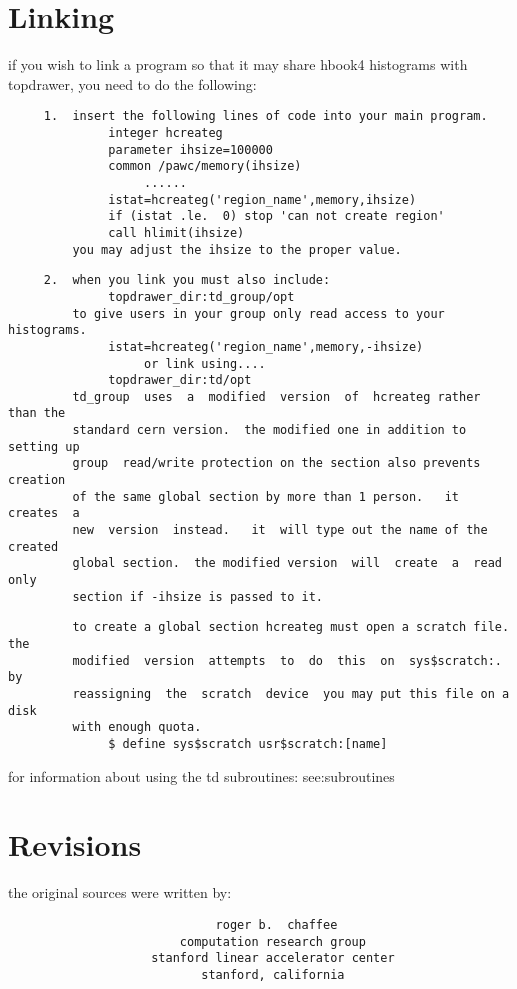 \section{Linking}
if  you  wish to link a program so that it may share hbook4 histograms with
topdrawer, you need to do the following:  

\begin{verbatim}
     1.  insert the following lines of code into your main program.  
              integer hcreateg 
              parameter ihsize=100000 
              common /pawc/memory(ihsize) 
                   ......  
              istat=hcreateg('region_name',memory,ihsize) 
              if (istat .le.  0) stop 'can not create region' 
              call hlimit(ihsize) 
         you may adjust the ihsize to the proper value.  
\end{verbatim}

\begin{verbatim}
     2.  when you link you must also include:  
              topdrawer_dir:td_group/opt 
         to give users in your group only read access to your histograms.  
              istat=hcreateg('region_name',memory,-ihsize) 
                   or link using....  
              topdrawer_dir:td/opt 
         td_group  uses  a  modified  version  of  hcreateg rather than the
         standard cern version.  the modified one in addition to setting up
         group  read/write protection on the section also prevents creation
         of the same global section by more than 1 person.   it  creates  a
         new  version  instead.   it  will type out the name of the created
         global section.  the modified version  will  create  a  read  only
         section if -ihsize is passed to it.  
\end{verbatim}

\begin{verbatim}
         to create a global section hcreateg must open a scratch file.  the
         modified  version  attempts  to  do  this  on  sys$scratch:.    by
         reassigning  the  scratch  device  you may put this file on a disk
         with enough quota.  
              $ define sys$scratch usr$scratch:[name] 
\end{verbatim}

for information about using the td subroutines:  
see:subroutines 
\section{Revisions}
the original sources were written by:  
\begin{verbatim}
                             roger b.  chaffee
                        computation research group
                    stanford linear accelerator center
                           stanford, california
\end{verbatim}

